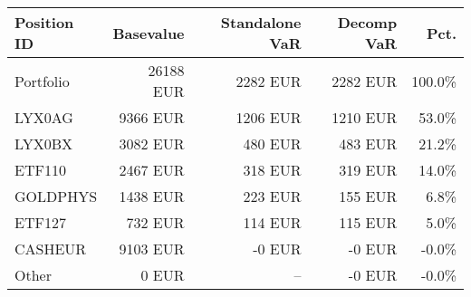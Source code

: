 \center
\begin{tabular}{l|r|r|r|r}
Position ID & Basevalue & Standalone VaR & Decomp VaR & Pct.\\\hline\hline
Portfolio &     26188 EUR &      2282  EUR&      2282 EUR & 100.0\%\\\hline
LYX0AG &      9366 EUR &      1206 EUR &      1210 EUR& 53.0\%\\
LYX0BX &      3082 EUR &       480 EUR &       483 EUR& 21.2\%\\
ETF110 &      2467 EUR &       318 EUR &       319 EUR& 14.0\%\\
GOLDPHYS &      1438 EUR &       223 EUR &       155 EUR& 6.8\%\\
ETF127 &       732 EUR &       114 EUR &       115 EUR& 5.0\%\\
CASHEUR &      9103 EUR &        -0 EUR &        -0 EUR& -0.0\%\\
Other &         0 EUR & -- &        -0 EUR& -0.0\%\\
\end{tabular}
